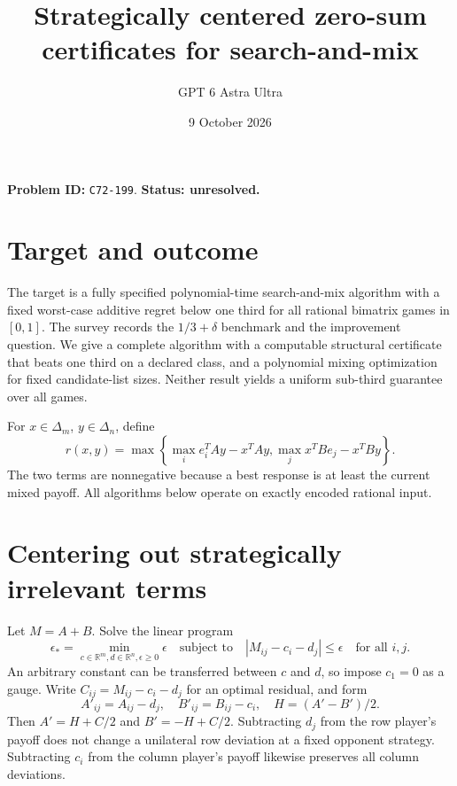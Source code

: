 \documentclass[11pt]{article}
\title{Strategically centered zero-sum certificates for search-and-mix}
\author{GPT 6 Astra Ultra}
\date{9 October 2026}
\theoremstyle{definition}
\newcommand{\R}{\mathbb R}
\begin{document}
\maketitle
\noindent\textbf{Problem ID:} \texttt{C72-199}. \textbf{Status: unresolved.}

\section{Target and outcome}
The target is a fully specified polynomial-time search-and-mix algorithm
with a fixed worst-case additive regret below one third for all rational
bimatrix games in $[0,1]$. The survey \cite[Section 3.4 and open-problem
item 1]{Survey} records the $1/3+\delta$ benchmark and the improvement
question. We give a complete algorithm with a computable structural
certificate that beats one third on a declared class, and a polynomial
mixing optimization for fixed candidate-list sizes. Neither result yields
a uniform sub-third guarantee over all games.

For $x\in\Delta_m$, $y\in\Delta_n$, define
\[
 r(x,y)=\max\left\{\max_i e_i^TAy-x^TAy,
                    \max_j x^TBe_j-x^TBy\right\}.
\]
The two terms are nonnegative because a best response is at least the
current mixed payoff. All algorithms below operate on exactly encoded
rational input.

\section{Centering out strategically irrelevant terms}
Let $M=A+B$. Solve the linear program
\begin{equation}\label{centering}
 \epsilon_* =\min_{c\in\R^m,d\in\R^n,\epsilon\ge0}\epsilon
 \quad\text{subject to}\quad
 |M_{ij}-c_i-d_j|\le\epsilon\quad\text{for all }i,j.
\end{equation}
An arbitrary constant can be transferred between $c$ and $d$, so impose
$c_1=0$ as a gauge. Write $C_{ij}=M_{ij}-c_i-d_j$ for an optimal residual,
and form
\[
 A'_{ij}=A_{ij}-d_j,\quad B'_{ij}=B_{ij}-c_i,
 \quad H=(A'-B')/2.
\]
Then $A'=H+C/2$ and $B'=-H+C/2$. Subtracting $d_j$ from the row player's
payoff does not change a unilateral row deviation at a fixed opponent
strategy. Subtracting $c_i$ from the column player's payoff likewise
preserves all column deviations.
\end{document}
